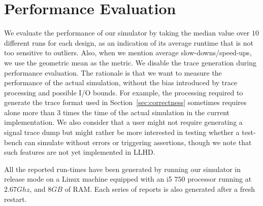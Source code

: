 
\section{Performance Evaluation}
We evaluate the performance of our simulator by taking the median value over $10$ different runs for each design, as an indication of its average runtime that is not too sensitive to outliers. Also, when we mention average slow-downs/speed-ups, we use the geometric mean as the metric. We disable the trace generation during performance evaluation. The rationale is that we want to measure the performance of the actual simulation, without the bias introduced by trace processing and possible I/O bounds. For example, the processing required to generate the trace format used in Section~\ref{sec:correctness} sometimes requires alone more than $3$ times the time of the actual simulation in the current implementation. We also consider that a user might not require generating a signal trace dump but might rather be more interested in testing whether a test-bench can simulate without errors or triggering assertions, though we note that such features are not yet implemented in LLHD.

All the reported run-times have been generated by running our simulator in release mode on a Linux machine equipped with an i5 $750$ processor running at $2.67Ghz$, and $8GB$ of RAM. Each series of reports is also generated after a fresh restart.

